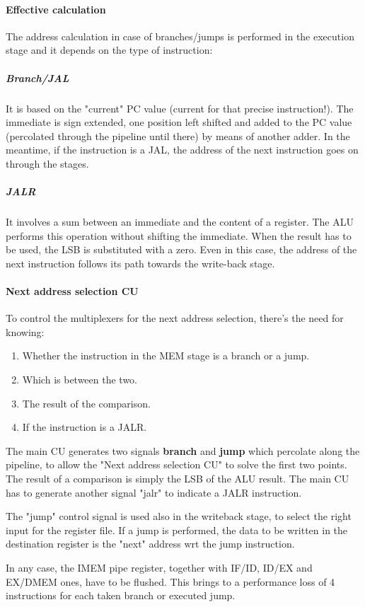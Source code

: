 \documentclass[a4paper]{article}
\begin{document}
\paragraph{Effective calculation}
The address calculation in case of branches/jumps is performed in the execution stage and it depends on the type of instruction:
\subparagraph{Branch/JAL} It is based on the "current" PC value (current for that precise instruction!). The immediate is sign extended, one position left shifted and added to the PC value (percolated through the pipeline until there) by means of another adder. In the meantime, if the instruction is a JAL, the address of the next instruction goes on through the stages.
\subparagraph{JALR} It involves a sum between an immediate and the content of a register. The ALU performs this operation without shifting the immediate. When the result has to be used, the LSB is substituted with a zero. Even in this case, the address of the next instruction follows its path towards the write-back stage.

\paragraph{Next address selection CU}
To control the multiplexers for the next address selection, there's the need for knowing:
\begin{enumerate}
	\item Whether the instruction in the MEM stage is a branch or a jump.
	\item Which is between the two.
	\item The result of the comparison.
	\item If the instruction is a JALR.
\end{enumerate}
The main CU generates two signals \textbf{branch} and \textbf{jump} which percolate along the pipeline, to allow the "Next address selection CU" to solve the first two points. The result of a comparison is simply the LSB of the ALU result. 
The main CU has to generate another signal "jalr" to indicate a JALR instruction.

The "jump" control signal is used also in the writeback stage, to select the right input for the register file. If a jump is performed, the data to be written in the destination register is the "next" address wrt the jump instruction. 

In any case, the IMEM pipe register, together with IF/ID, ID/EX and EX/DMEM ones, have to be flushed. This brings to a performance loss of 4 instructions for each taken branch or executed jump.
\end{document}

